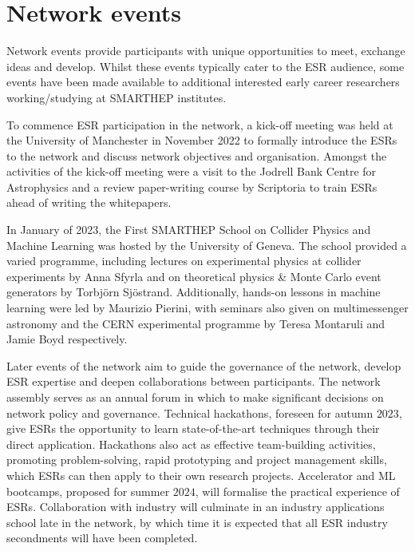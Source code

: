 \section{Network events}
\label{events}
Network events provide participants with unique opportunities to meet, exchange ideas and develop. Whilst these events typically cater to the ESR audience, some events have been made available to additional interested early career researchers working/studying at SMARTHEP institutes. %

To commence ESR participation in the network, a kick-off meeting was held at the University of Manchester in November 2022 to formally introduce the ESRs to the network and discuss network objectives and organisation. Amongst the activities of the kick-off meeting were a visit to the Jodrell Bank Centre for Astrophysics and a review paper-writing course by Scriptoria to train ESRs ahead of writing the whitepapers.

In January of 2023, the First SMARTHEP School on Collider Physics and Machine Learning was hosted by the University of Geneva. The school provided a varied programme, including lectures on experimental physics at collider experiments by Anna Sfyrla and on theoretical physics \& Monte Carlo event generators by Torbj\"orn Sj\"ostrand. Additionally, hands-on lessons in machine learning were led by Maurizio Pierini, with seminars also given on multimessenger astronomy and the CERN experimental programme by Teresa Montaruli and Jamie Boyd respectively.

Later events of the network aim to guide the governance of the network, develop ESR expertise and deepen collaborations between participants. The network assembly serves as an annual forum in which to make significant decisions on network policy and governance. Technical hackathons, foreseen for autumn $2023$, give ESRs the opportunity to learn state-of-the-art techniques through their direct application. Hackathons also act as effective team-building activities, promoting problem-solving, rapid prototyping and project management skills, which ESRs can then apply to their own research projects. Accelerator and ML bootcamps, proposed for summer $2024$, will formalise the practical experience of ESRs. Collaboration with industry will culminate in an industry applications school late in the network, by which time it is expected that all ESR industry secondments will have been completed.
